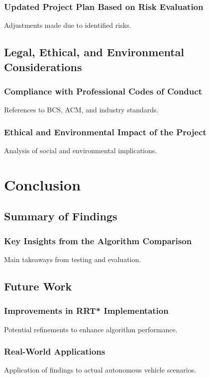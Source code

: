 \documentclass[a4paper,11pt]{report}
\begin{document}
\subsection{Updated Project Plan Based on Risk Evaluation}
Adjustments made due to identified risks.

\section{Legal, Ethical, and Environmental Considerations}
\subsection{Compliance with Professional Codes of Conduct}
References to BCS, ACM, and industry standards.

\subsection{Ethical and Environmental Impact of the Project}
Analysis of social and environmental implications.

\newpage

\chapter{Conclusion}
\section{Summary of Findings}
\subsection{Key Insights from the Algorithm Comparison}
Main takeaways from testing and evaluation.

\section{Future Work}
\subsection{Improvements in RRT* Implementation}
Potential refinements to enhance algorithm performance.

\subsection{Real-World Applications}
Application of findings to actual autonomous vehicle scenarios.
\end{document}
